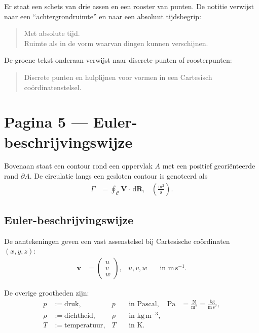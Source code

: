 \documentclass[11pt]{article}
\newcommand{\dd}{\,\mathrm{d}}
\newcommand{\vect}[1]{\mathbf{#1}}
\newcommand{\onzeker}[1]{\textcolor{red!70!black}{#1}}
\begin{document}
Er staat een schets van drie assen en een rooster van punten. De notitie verwijst naar een ``achtergrondruimte'' en naar een absoluut tijdsbegrip:
\begin{quote}
\onzeker{Met absolute tijd.}\\
\onzeker{Ruimte als in de vorm waarvan dingen kunnen verschijnen.}
\end{quote}

De groene tekst onderaan verwijst naar discrete punten of roosterpunten:
\begin{quote}
\onzeker{Discrete punten en hulplijnen voor vormen in een Cartesisch coördinatenstelsel.}
\end{quote}

\section*{Pagina 5 --- Euler-beschrijvingswijze}

Bovenaan staat een contour rond een oppervlak $A$ met een positief georiënteerde rand $\partial A$. De circulatie langs een gesloten contour is genoteerd als
\begin{align*}
\Gamma
  &=
  \oint_{\mathcal{C}}
  \vect{V}\cdot \dd \vect{R},
  &
  \left(\frac{\mathrm{m}^2}{\mathrm{s}}\right).
\end{align*}

\subsection*{Euler-beschrijvingswijze}

De aantekeningen geven een vast assenstelsel bij Cartesische coördinaten $\left(x,y,z\right)$:
\begin{align*}
\vect{v}
  &=
  \begin{pmatrix}
  u\\
  v\\
  w
  \end{pmatrix},
  &
  u,v,w
  &\quad \text{in } \mathrm{m\,s^{-1}}.
\end{align*}

De overige grootheden zijn:
\begin{align*}
p
  &:= \text{druk},
  &
  p
  &\quad \text{in Pascal},
  &
  \mathrm{Pa}
  &=\frac{\mathrm{N}}{\mathrm{m}^2}
   =\frac{\mathrm{kg}}{\mathrm{m\,s^2}},
\\
\rho
  &:= \text{dichtheid},
  &
  \rho
  &\quad \text{in } \mathrm{kg\,m^{-3}},
\\
T
  &:= \text{temperatuur},
  &
  T
  &\quad \text{in } \mathrm{K}.
\end{align*}
\end{document}
